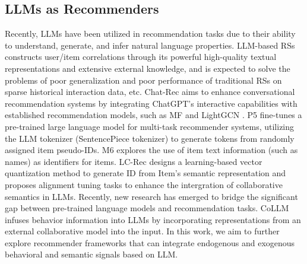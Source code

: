 \subsection{LLMs as Recommenders}
Recently, LLMs have been utilized in recommendation tasks due to their ability to understand, generate, and infer natural language properties. LLM-based RSs \cite{liu2024store} constructs user/item correlations through its powerful high-quality textual representations and extensive external knowledge, and is expected to solve the problems of poor generalization \cite{lin2023can} and poor performance of traditional RSs on sparse historical interaction data, etc.
Chat-Rec \cite{gao2023chat} aims to enhance conversational recommendation systems by integrating ChatGPT’s interactive capabilities with established recommendation models, such as MF \cite{koren2009matrix} and LightGCN \cite{he2020lightgcn}. P5 \cite{geng2022p5} fine-tunes a pre-trained large language model for multi-task recommender systems, utilizing the LLM tokenizer (SentencePiece tokenizer) to generate tokens from randomly assigned item pseudo-IDs. M6 \cite{cui2022m6}explores the use of item text information (such as names) as identifiers for items. LC-Rec \cite{zheng2024lcrec} designs a learning-based vector quantization method to generate ID from Item’s semantic representation and proposes alignment tuning tasks to enhance the intergration of collaborative semantics in LLMs.
Recently, new research has emerged to bridge the significant gap between pre-trained language models and recommendation tasks. CoLLM \cite{zhang2023collm} infuses behavior information into LLMs by incorporating representations from an external collaborative model into the input.
In this work, we aim to further explore recommender frameworks that can integrate endogenous and exogenous behavioral and semantic signals based on LLM.